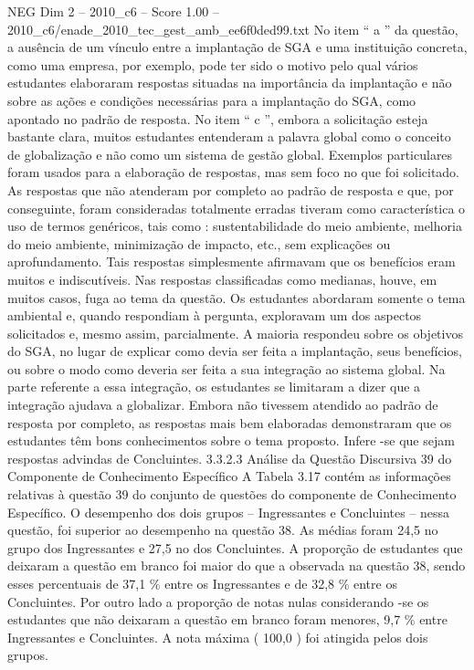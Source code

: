 \begin{textsample}{NEG Dim 2 – 2010\_c6 – Score 1.00 – 2010\_c6/enade\_2010\_tec\_gest\_amb\_ee6f0ded99.txt}
No item “ a ” da questão, a ausência de um vínculo entre a implantação de SGA e uma instituição concreta, como uma empresa, por exemplo, pode ter sido o motivo pelo qual vários estudantes elaboraram respostas situadas na importância da implantação e não sobre as ações e condições necessárias para a implantação do SGA, como apontado no padrão de resposta.
No item “ c ”, embora a solicitação esteja bastante clara, muitos estudantes entenderam a palavra global como o conceito de globalização e não como um sistema de gestão global.
Exemplos particulares foram usados para a elaboração de respostas, mas sem foco no que foi solicitado.
As respostas que não atenderam por completo ao padrão de resposta e que, por conseguinte, foram consideradas totalmente erradas tiveram como característica o uso de termos genéricos, tais como : sustentabilidade do meio ambiente, melhoria do meio ambiente, minimização de impacto, etc., sem explicações ou aprofundamento.
Tais respostas simplesmente afirmavam que os benefícios eram muitos e indiscutíveis.
Nas respostas classificadas como medianas, houve, em muitos casos, fuga ao tema da questão.
Os estudantes abordaram somente o tema ambiental e, quando respondiam à pergunta, exploravam um dos aspectos solicitados e, mesmo assim, parcialmente.
A maioria respondeu sobre os objetivos do SGA, no lugar de explicar como devia ser feita a implantação, seus benefícios, ou sobre o modo como deveria ser feita a sua integração ao sistema global.
Na parte referente a essa integração, os estudantes se limitaram a dizer que a integração ajudava a globalizar.
Embora não tivessem atendido ao padrão de resposta por completo, as respostas mais bem elaboradas demonstraram que os estudantes têm bons conhecimentos sobre o tema proposto.
Infere -se que sejam respostas advindas de Concluintes. 3.3.2.3 Análise da Questão Discursiva 39 do Componente de Conhecimento Específico A Tabela 3.17 contém as informações relativas à questão 39 do conjunto de questões do componente de Conhecimento Específico.
O desempenho dos dois grupos – Ingressantes e Concluintes – nessa questão, foi superior ao desempenho na questão 38.
As médias foram 24,5 no grupo dos Ingressantes e 27,5 no dos Concluintes.
A proporção de estudantes que deixaram a questão em branco foi maior do que a observada na questão 38, sendo esses percentuais de 37,1 \% entre os Ingressantes e de 32,8 \% entre os Concluintes.
Por outro lado a proporção de notas nulas considerando -se os estudantes que não deixaram a questão em branco foram menores, 9,7 \% entre Ingressantes e Concluintes.
A nota máxima ( 100,0 ) foi atingida pelos dois grupos.

\end{textsample}
